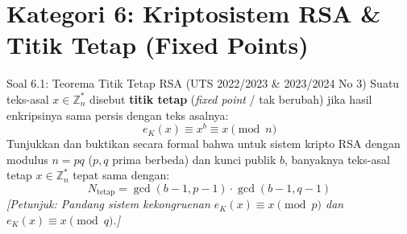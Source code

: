 \documentclass[11pt,a4paper]{article}
\begin{document}
\newpage
\section{Kategori 6: Kriptosistem RSA \& Titik Tetap (Fixed Points)}

\begin{soalbox}{Soal 6.1: Teorema Titik Tetap RSA (UTS 2022/2023 \& 2023/2024 No 3)}
Suatu teks-asal $x \in \mathbb{Z}_n^*$ disebut \textbf{titik tetap} (\textit{fixed point} / tak berubah) jika hasil enkripsinya sama persis dengan teks asalnya:
\[
e_K(x) \equiv x^b \equiv x \pmod n
\]
Tunjukkan dan buktikan secara formal bahwa untuk sistem kripto RSA dengan modulus $n = pq$ ($p, q$ prima berbeda) dan kunci publik $b$, banyaknya teks-asal tetap $x \in \mathbb{Z}_n^*$ tepat sama dengan:
\[
N_{\text{tetap}} = \gcd(b - 1, p - 1) \cdot \gcd(b - 1, q - 1)
\]
\textit{[Petunjuk: Pandang sistem kekongruenan $e_K(x) \equiv x \pmod p$ dan $e_K(x) \equiv x \pmod q$.]}
\end{soalbox}
\end{document}
